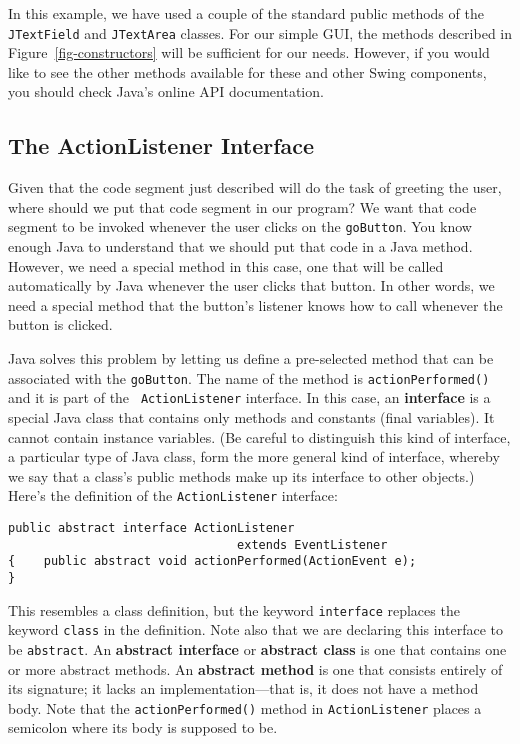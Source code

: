 In this example, we have used a couple of the standard public methods
of the {\tt JTextField} and {\tt JTextArea} classes.  
For our simple GUI, the methods described in Figure~\ref{fig-constructors}
\WWWjava
will be sufficient for our needs. However, if you would like to see the 
other methods available for these and other Swing components, you should
check Java's online API documentation.

\subsection{The ActionListener Interface}

Given that the code segment just described will do the task of
greeting the user, where should we put that code segment in our
program? We want that code segment to be invoked whenever the user
clicks on the {\tt goButton}.  You know enough Java to understand that
we should put that code in a Java method. However, we need a special
method in this case, one that will be called automatically by Java
whenever the user clicks that button. In other words, we need a
special method that the button's listener knows how to call whenever
the button is clicked.

Java solves this problem by letting us define a pre-selected method
that can be associated with the {\tt goButton}.  The name of the
method is {\tt actionPerformed()} and it is part of the {\tt
ActionListener} interface.  In this case, an {\bf interface} is a
special Java class that contains only methods and constants (final
variables).  It cannot contain instance variables. (Be careful to
distinguish this kind of interface, a particular type of Java class,
form the more general kind of interface, whereby we say that a class's
public methods make up its interface to other objects.) Here's the
definition of the {\tt ActionListener} interface:

\begin{jjjlisting}
\begin{lstlisting}
public abstract interface ActionListener 
                                extends EventListener 
{    public abstract void actionPerformed(ActionEvent e);
}
\end{lstlisting}
\end{jjjlisting}

\noindent This resembles a class definition, but the keyword {\tt interface}
replaces the keyword {\tt class} in the definition. Note also that we
are declaring this interface to be {\tt abstract}. An {\bf abstract
interface} or {\bf abstract class} is one that contains one or more
abstract methods. An {\bf abstract method} is one that consists
entirely of its signature; it lacks an implementation---that is, it
does not have a method body.  Note that the {\tt actionPerformed()}
method in {\tt ActionListener} places a semicolon where its body is
supposed to be.

